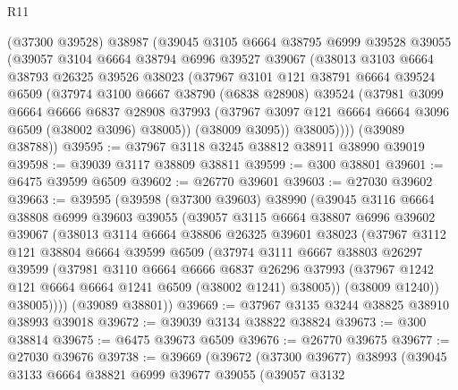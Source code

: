 \begin{lexlean}{R11}
\begin{coremodule}
      (@37300 @39528)
      @38987
      (@39045
        @3105
        @6664
        @38795
        @6999
        @39528
        @39055
        (@39057
          @3104
          @6664
          @38794
          @6996
          @39527
          @39067
          (@38013
            @3103
            @6664
            @38793
            @26325
            @39526
            @38023
            (@37967
              @3101
              @121
              @38791
              @6664
              @39524
              @6509
              (@37974
                @3100
                @6667
                @38790
                (@6838 @28908)
                @39524
                (@37981
                  @3099
                  @6664
                  @6666
                  @6837
                  @28908
                  @37993
                  (@37967 @3097 @121 @6664 @6664 @3096 @6509 (@38002 @3096) @38005))
                (@38009 @3095))
              @38005))))
      (@39089 @38788))
@39595 := @37967 @3118 @3245 @38812 @38911 @38990 @39019
@39598 := @39039 @3117 @38809 @38811
@39599 := @300 @38801
@39601 := @6475 @39599 @6509
@39602 := @26770 @39601
@39603 := @27030 @39602
@39663 := @39595
    (@39598
      (@37300 @39603)
      @38990
      (@39045
        @3116
        @6664
        @38808
        @6999
        @39603
        @39055
        (@39057
          @3115
          @6664
          @38807
          @6996
          @39602
          @39067
          (@38013
            @3114
            @6664
            @38806
            @26325
            @39601
            @38023
            (@37967
              @3112
              @121
              @38804
              @6664
              @39599
              @6509
              (@37974
                @3111
                @6667
                @38803
                @26297
                @39599
                (@37981
                  @3110
                  @6664
                  @6666
                  @6837
                  @26296
                  @37993
                  (@37967 @1242 @121 @6664 @6664 @1241 @6509 (@38002 @1241) @38005))
                (@38009 @1240))
              @38005))))
      (@39089 @38801))
@39669 := @37967 @3135 @3244 @38825 @38910 @38993 @39018
@39672 := @39039 @3134 @38822 @38824
@39673 := @300 @38814
@39675 := @6475 @39673 @6509
@39676 := @26770 @39675
@39677 := @27030 @39676
@39738 := @39669
    (@39672
      (@37300 @39677)
      @38993
      (@39045
        @3133
        @6664
        @38821
        @6999
        @39677
        @39055
        (@39057
          @3132

\end{coremodule}
\end{lexlean}
